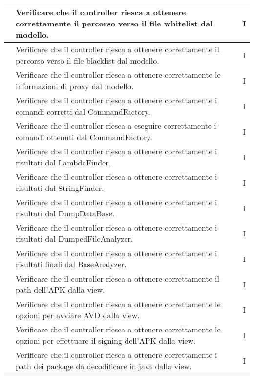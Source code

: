 \begin{longtable}{ |C{3cm} | C{8.5cm}| C{1.5cm} |}
     & Verificare che il controller riesca a ottenere correttamente il percorso verso il file whitelist dal modello.              & I \\\hline
     & Verificare che il controller riesca a ottenere correttamente il percorso verso il file blacklist dal modello.              & I \\\hline
     & Verificare che il controller riesca a ottenere correttamente le informazioni di proxy dal modello.                         & I \\\hline
     & Verificare che il controller riesca a ottenere correttamente i comandi corretti dal CommandFactory.                        & I \\\hline
     & Verificare che il controller riesca a eseguire correttamente i comandi ottenuti dal CommandFactory.                        & I \\\hline
     & Verificare che il controller riesca a ottenere correttamente i risultati dal LambdaFinder.                                 & I \\\hline
     & Verificare che il controller riesca a ottenere correttamente i risultati dal StringFinder.                                 & I \\\hline
     & Verificare che il controller riesca a ottenere correttamente i risultati dal DumpDataBase.                                 & I \\\hline
     & Verificare che il controller riesca a ottenere correttamente i risultati dal DumpedFileAnalyzer.                           & I \\\hline
     & Verificare che il controller riesca a ottenere correttamente i risultati finali dal BaseAnalyzer.                          & I \\\hline
     & Verificare che il controller riesca a ottenere correttamente il path dell'APK dalla view.                                  & I \\\hline
     & Verificare che il controller riesca a ottenere correttamente le opzioni per avviare AVD dalla view.                        & I \\\hline
     & Verificare che il controller riesca a ottenere correttamente le opzioni per effettuare il signing dell'APK dalla view.     & I \\\hline
     & Verificare che il controller riesca a ottenere correttamente i path dei package da decodificare in java dalla view.        & I \\\hline

\end{longtable}
